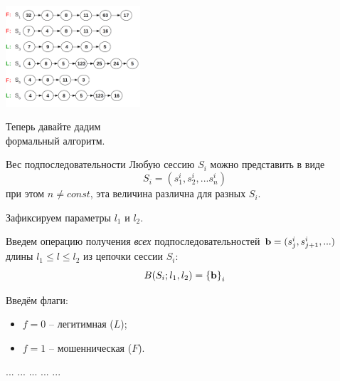 \begin{frame}
	\Large
	\centering
\end{frame}


\begin{frame}[t]
	\includegraphics[width=5cm]{../pic/beh/idea_2.png}
\end{frame}

\begin{frame}
	\Large
	\centering
	Теперь давайте дадим \\ формальный алгоритм.
\end{frame}

\begin{frame}{Вес подпоследовательности}
	\small
	Любую сессию $S_i$ можно представить в виде
	\begin{equation}
	S_i = \left( s_1^i, s_2^i, ... s_n^i\right)
	\end{equation}
	при этом $n \neq const$, эта величина различна для разных $S_i$.
	
	Зафиксируем параметры $l_1$ и $l_2$.
	
	Введем операцию получения \textit{всех} подпоследовательностей $\bold b = (s_j^i, s_{j+1}^i, ...)$ длины $l_1 \leqslant l \leqslant l_2$
	из цепочки сессии $S_i$:
	\begin{equation}
	B(S_i ; l_1, l_2) = \left\{ \bold b \right\}_i
	\end{equation}
	
	Введём флаги:
	\begin{itemize}
		\item $f=0$ -- легитимная ($L$);
		\item $f=1$ -- мошенническая ($F$).
	\end{itemize}

	... ... ... ... ...
\end{frame}


